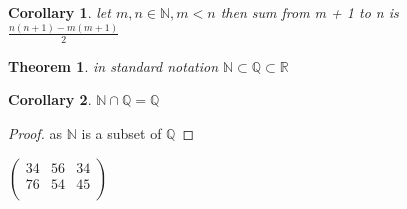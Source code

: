 \documentclass{article}
\newtheorem{theorem}{Theorem}[section]
\newtheorem{corollary}{Corollary}[theorem]
\newcommand{\R}{\mathbb{R}}
\newcommand{\N}{\mathbb{N}}
\newcommand{\Q}{\mathbb{Q}}
\newcommand{\bv}[6]{\begin{pmatrix}
    #1 & #2 & #3\\
    #4 & #5 & #6\\
\end{pmatrix}}
\begin{document}
\begin{corollary}
    let $m, n \in \N, m < n$ then sum from m + 1 to n is $\frac{n(n+1) - m(m+1)}{2}$
\end{corollary}

\begin{theorem}
    in standard notation  $\N \subset \Q \subset \R$
\end{theorem}

\begin{corollary}
    $\N \cap \Q = \Q$ 
\end{corollary}
\begin{proof}
    as $\N$ is a subset of $\Q$
\end{proof}

$\bv{34}{56}{34}{76}{54}{45}$
\end{document}
